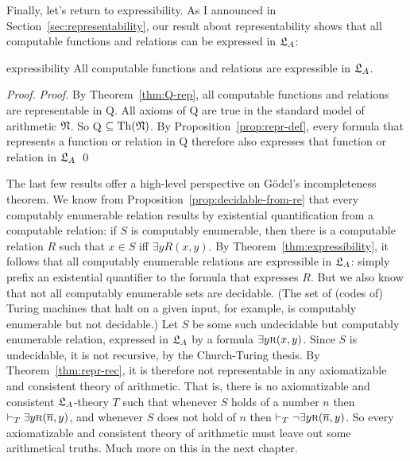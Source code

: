 Finally,
let's return to expressibility.
As I announced in Section~\ref{sec:representability},
our result about representability %
shows that all computable functions and relations can be expressed in $\mathfrak{L}_{A}$:

\begin{theorem}{}{expressibility}
  All computable functions and relations are expressible in $\mathfrak{L}_{A}$.
\end{theorem}
\begin{proof}
  \emph{Proof.}
  By Theorem~\ref{thm:Q-rep},
  all computable functions and relations are representable in Q.
  All axioms of Q are true in the standard model of arithmetic $\mathfrak{N}$.
  So Q $\subseteq \mathrm{Th}(\mathfrak{N})$.
  By Proposition~\ref{prop:repr-def},
  every formula that represents a function or relation in Q
  therefore also expresses that function or relation in $\mathfrak{L}_A$
  \qed
\end{proof}

\iffalse

The last few results
offer a high-level perspective on Gödel's incompleteness theorem.
We know from Proposition~\ref{prop:decidable-from-re} that
every computably enumerable relation results
by existential quantification from a computable relation:
if $S$ is computably enumerable,
then there is a computable relation $R$ such that
$x \in S$ iff $\exists y R(x,y)$.
By Theorem~\ref{thm:expressibility},
it follows that all computably enumerable relations are expressible in $\mathfrak{L}_{A}$:
simply prefix an existential quantifier to the formula that expresses $R$.
But we also know that not all computably enumerable sets are decidable.
(The set of (codes of) Turing machines that halt on a given input,
for example,
is computably enumerable but not decidable.)
Let $S$ be some such undecidable but computably enumerable relation,
expressed in $\mathfrak{L}_A$ by a formula $\exists y \smallcaps{R}(x,y)$.
Since $S$ is undecidable,
it is not recursive,
by the Church-Turing thesis.
By Theorem~\ref{thm:repr-rec},
it is therefore not representable in any axiomatizable and consistent theory of arithmetic.
That is,
there is no axiomatizable and consistent $\mathfrak{L}_{A}$-theory $T$ such that
whenever $S$ holds of a number $n$
then $\vdash_{T} \exists y \smallcaps{R}(\num{n},y)$,
and whenever $S$ does not hold of $n$
then $\vdash_{T} \neg \exists y \smallcaps{R}(\num{n},y)$.
So every axiomatizable and consistent theory of arithmetic must leave out some arithmetical truths.
Much more on this in the next chapter.

